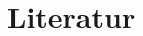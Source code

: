 \documentclass[colorBG,slideColor,8pt]{beamer}
\begin{document}
\section{Literatur}

\begin{frame}
\begin{columns}
\begin{column}{0.9\linewidth}
\nocite{*}
\printbibliography[heading=none]
\end{column}
\end{columns}
\end{frame}
\end{document}

